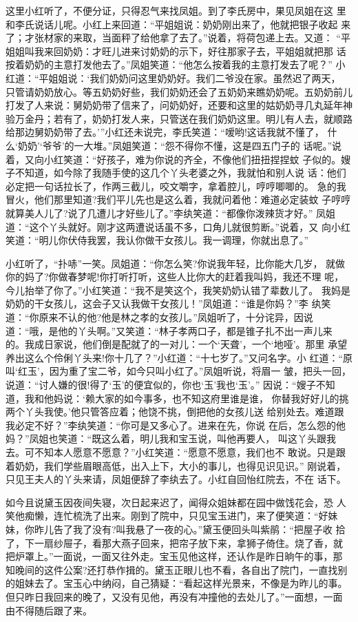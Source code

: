 这里小红听了，不便分证，只得忍气来找凤姐。到了李氏房中，果见凤姐在这
里和李氏说话儿呢。小红上来回道：“平姐姐说：奶奶刚出来了，他就把银子收起
来了；才张材家的来取，当面秤了给他拿了去了。”说着，将荷包递上去。又道：
“平姐姐叫我来回奶奶：才旺儿进来讨奶奶的示下，好往那家子去，平姐姐就把那
话按着奶奶的主意打发他去了。”凤姐笑道：“他怎么按着我的主意打发去了呢？”
小红道：“平姐姐说：‘我们奶奶问这里奶奶好。我们二爷没在家。虽然迟了两天，
只管请奶奶放心。等五奶奶好些，我们奶奶还会了五奶奶来瞧奶奶呢。五奶奶前儿
打发了人来说：舅奶奶带了信来了，问奶奶好，还要和这里的姑奶奶寻几丸延年神
验万金丹；若有了，奶奶打发人来，只管送在我们奶奶这里。明儿有人去，就顺路
给那边舅奶奶带了去。’”小红还未说完，李氏笑道：“嗳哟!这话我就不懂了，
什么‘奶奶’‘爷爷’的一大堆。”凤姐笑道：“怨不得你不懂，这是四五门子的
话呢。”说着，又向小红笑道：“好孩子，难为你说的齐全，不像他们扭扭捏捏蚊
子似的。嫂子不知道，如今除了我随手使的这几个丫头老婆之外，我就怕和别人说
话：他们必定把一句话拉长了，作两三截儿，咬文嚼字，拿着腔儿，哼哼唧唧的。
急的我冒火，他们那里知道?我们平儿先也是这么着，我就问着他：难道必定装蚊
子哼哼就算美人儿了?说了几遭儿才好些儿了。”李纨笑道：“都像你泼辣货才好。”
凤姐道：“这个丫头就好。刚才这两遭说话虽不多，口角儿就很剪断。”说着，又
向小红笑道：“明儿你伏侍我罢，我认你做干女孩儿。我一调理，你就出息了。”

小红听了，“扑哧”一笑。凤姐道：“你怎么笑?你说我年轻，比你能大几岁，
就做你的妈了?你做春梦呢!你打听打听，这些人比你大的赶着我叫妈，我还不理
呢，今儿抬举了你了。”小红笑道：“我不是笑这个，我笑奶奶认错了辈数儿了。
我妈是奶奶的干女孩儿，这会子又认我做干女孩儿！”凤姐道：“谁是你妈？”李
纨笑道：“你原来不认的他?他是林之孝的女孩儿。”凤姐听了，十分诧异，因说
道：“哦，是他的丫头啊。”又笑道：“林子孝两口子，都是锥子扎不出一声儿来
的。我成日家说，他们倒是配就了的一对儿：一个‘天聋’，一个‘地哑’。那里
承望养出这么个伶俐丫头来!你十几了？”小红道：“十七岁了。”又问名字。小
红道：“原叫‘红玉’，因为重了宝二爷，如今只叫小红了。”凤姐听说，将眉一
皱，把头一回，说道：“讨人嫌的很!得了‘玉’的便宜似的，你也‘玉’我也‘玉’。”
因说：“嫂子不知道，我和他妈说：‘赖大家的如今事多，也不知这府里谁是谁，
你替我好好儿的挑两个丫头我使。’他只管答应着；他饶不挑，倒把他的女孩儿送
给别处去。难道跟我必定不好？”李纨笑道：“你可是又多心了。进来在先，你说
在后，怎么怨的他妈？”凤姐也笑道：“既这么着，明儿我和宝玉说，叫他再要人，
叫这丫头跟我去。可不知本人愿意不愿意？”小红笑道：“愿意不愿意，我们也不
敢说。只是跟着奶奶，我们学些眉眼高低，出入上下，大小的事儿，也得见识见识。”
刚说着，只见王夫人的丫头来请，凤姐便辞了李纨去了。小红自回怡红院去，不在
话下。

如今且说黛玉因夜间失寝，次日起来迟了，闻得众姐妹都在园中做饯花会，恐
人笑他痴懒，连忙梳洗了出来。刚到了院中，只见宝玉进门，来了便笑道：“好妹
妹，你昨儿告了我了没有?叫我悬了一夜的心。”黛玉便回头叫紫鹃：“把屋子收
拾了，下一扇纱屉子，看那大燕子回来，把帘子放下来，拿狮子倚住。烧了香，就
把炉罩上。”一面说，一面又往外走。宝玉见他这样，还认作是昨日晌午的事，那
知晚间的这件公案?还打恭作揖的。黛玉正眼儿也不看，各自出了院门，一直找别
的姐妹去了。宝玉心中纳闷，自己猜疑：“看起这样光景来，不像是为昨儿的事。
但只昨日我回来的晚了，又没有见他，再没有冲撞他的去处儿了。”一面想，一面
由不得随后跟了来。

